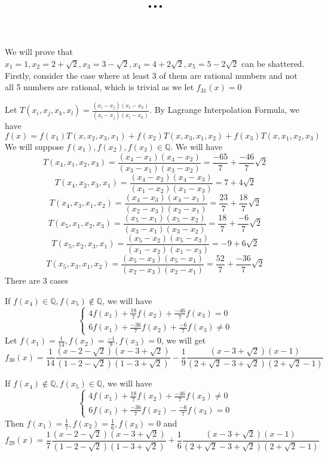 \documentclass[english, 10pt]{article} %
\title{...}
\begin{document}
\maketitle
We will prove that $x_1=1, x_2=2+\sqrt{2},x_3=3-\sqrt{2}, x_4 = 4+2\sqrt{2}, x_5 = 5-2\sqrt{2}$ can be shattered. Firstly, consider the case where at least 3 of them are rational numbers and not all 5 numbers are rational, which is trivial as we let $f_{31}(x) = 0$

Let $T(x_i,x_j,x_k,x_l) = \frac{(x_i-x_j)(x_i-x_k)}{(x_l-x_j)(x_l-x_k)}$. By Lagrange Interpolation Formula, we have
$$f(x) = f(x_1)T(x,x_2,x_3,x_1)+f(x_2)T(x,x_3,x_1,x_2)+f(x_3)T(x,x_1,x_2,x_3)$$
We will suppose $f(x_1),f(x_2),f(x_3) \in \mathbb{Q}$. We will have
$$T(x_4,x_1,x_2,x_3) = \frac{(x_4-x_1)(x_4-x_2)}{(x_3-x_1)(x_3-x_2)} = \frac{-65}{7}+\frac{-46}{7}\sqrt{2}$$
$$T(x_4,x_2,x_3,x_1) = \frac{(x_4-x_2)(x_4-x_3)}{(x_1-x_2)(x_1-x_3)} = 7+4\sqrt{2}$$
$$T(x_4,x_3,x_1,x_2) = \frac{(x_4-x_3)(x_4-x_1)}{(x_2-x_3)(x_2-x_1)}=\frac{23}{7}+\frac{18}{7}\sqrt{2}$$
$$T(x_5,x_1,x_2,x_3) = \frac{(x_5-x_1)(x_5-x_2)}{(x_3-x_1)(x_3-x_2)} = \frac{18}{7}+\frac{-6}{7}\sqrt{2}$$
$$T(x_5,x_2,x_3,x_1) = \frac{(x_5-x_2)(x_5-x_3)}{(x_1-x_2)(x_1-x_3)} = -9+6\sqrt{2}$$
$$T(x_5,x_3,x_1,x_2) = \frac{(x_5-x_3)(x_5-x_1)}{(x_2-x_3)(x_2-x_1)}=\frac{52}{7}+\frac{-36}{7}\sqrt{2}$$
There are $3$ cases

If $f(x_4) \in \mathbb{Q}, f(x_5) \not \in \mathbb{Q}$, we will have
$$\begin{cases}
4f(x_1)+\frac{18}{7}f(x_2)+\frac{-46}{7}f(x_3) = 0\\
6f(x_1)+\frac{-36}{7}f(x_2)+\frac{-6}{7}f(x_3) \neq 0
\end{cases}$$
Let $f(x_1)=\frac{1}{14},f(x_2)=\frac{-1}{9},f(x_3)=0$, we will get
$$f_{30}(x)=\frac{1}{14}\frac{(x-2-\sqrt{2})(x-3+\sqrt{2})}{(1-2-\sqrt{2})(1-3+\sqrt{2})}-\frac{1}{9}\frac{(x-3+\sqrt{2})(x-1)}{(2+\sqrt{2}-3+\sqrt{2})(2+\sqrt{2}-1)}$$

If $f(x_4) \not \in \mathbb{Q}, f(x_5) \in \mathbb{Q}$, we will have
$$\begin{cases}
4f(x_1)+\frac{18}{7}f(x_2)+\frac{-46}{7}f(x_3) \neq 0\\
6f(x_1)+\frac{-36}{7}f(x_2)-\frac{-6}{7}f(x_3) = 0
\end{cases}$$
Then $f(x_1)=\frac{1}{7}, f(x_2)=\frac{1}{6}, f(x_3)=0$ and
$$f_{29}(x) = \frac{1}{7}\frac{(x-2-\sqrt{2})(x-3+\sqrt{2})}{(1-2-\sqrt{2})(1-3+\sqrt{2})}+\frac{1}{6}\frac{(x-3+\sqrt{2})(x-1)}{(2+\sqrt{2}-3+\sqrt{2})(2+\sqrt{2}-1)}$$
\end{document}
